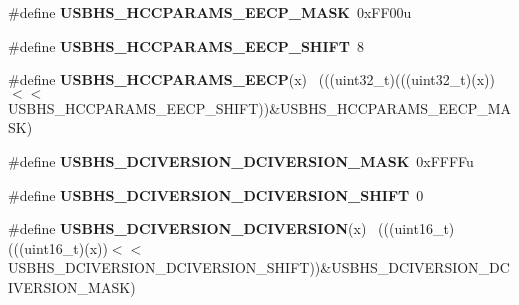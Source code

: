 \begin{DoxyCompactItemize}
\item 
\hypertarget{group___u_s_b_h_s___register___masks_ga00a806b7c08961160c2d8b6ffb14e380}{}\#define {\bfseries U\+S\+B\+H\+S\+\_\+\+H\+C\+C\+P\+A\+R\+A\+M\+S\+\_\+\+E\+E\+C\+P\+\_\+\+M\+A\+S\+K}~0x\+F\+F00u\label{group___u_s_b_h_s___register___masks_ga00a806b7c08961160c2d8b6ffb14e380}

\item 
\hypertarget{group___u_s_b_h_s___register___masks_ga697092761add4b7509d77b602f200ba1}{}\#define {\bfseries U\+S\+B\+H\+S\+\_\+\+H\+C\+C\+P\+A\+R\+A\+M\+S\+\_\+\+E\+E\+C\+P\+\_\+\+S\+H\+I\+F\+T}~8\label{group___u_s_b_h_s___register___masks_ga697092761add4b7509d77b602f200ba1}

\item 
\hypertarget{group___u_s_b_h_s___register___masks_gaf2eae809b350ccb9d8b061f40caa9e9f}{}\#define {\bfseries U\+S\+B\+H\+S\+\_\+\+H\+C\+C\+P\+A\+R\+A\+M\+S\+\_\+\+E\+E\+C\+P}(x)                                ~(((uint32\+\_\+t)(((uint32\+\_\+t)(x))$<$$<$U\+S\+B\+H\+S\+\_\+\+H\+C\+C\+P\+A\+R\+A\+M\+S\+\_\+\+E\+E\+C\+P\+\_\+\+S\+H\+I\+F\+T))\&U\+S\+B\+H\+S\+\_\+\+H\+C\+C\+P\+A\+R\+A\+M\+S\+\_\+\+E\+E\+C\+P\+\_\+\+M\+A\+S\+K)\label{group___u_s_b_h_s___register___masks_gaf2eae809b350ccb9d8b061f40caa9e9f}

\item 
\hypertarget{group___u_s_b_h_s___register___masks_ga7ada79f215237f768f3098114bf1b569}{}\#define {\bfseries U\+S\+B\+H\+S\+\_\+\+D\+C\+I\+V\+E\+R\+S\+I\+O\+N\+\_\+\+D\+C\+I\+V\+E\+R\+S\+I\+O\+N\+\_\+\+M\+A\+S\+K}~0x\+F\+F\+F\+Fu\label{group___u_s_b_h_s___register___masks_ga7ada79f215237f768f3098114bf1b569}

\item 
\hypertarget{group___u_s_b_h_s___register___masks_ga24d240fb588346ff3092aa123808424b}{}\#define {\bfseries U\+S\+B\+H\+S\+\_\+\+D\+C\+I\+V\+E\+R\+S\+I\+O\+N\+\_\+\+D\+C\+I\+V\+E\+R\+S\+I\+O\+N\+\_\+\+S\+H\+I\+F\+T}~0\label{group___u_s_b_h_s___register___masks_ga24d240fb588346ff3092aa123808424b}

\item 
\hypertarget{group___u_s_b_h_s___register___masks_gae92f6f8197efee16b3f67f4602f3108e}{}\#define {\bfseries U\+S\+B\+H\+S\+\_\+\+D\+C\+I\+V\+E\+R\+S\+I\+O\+N\+\_\+\+D\+C\+I\+V\+E\+R\+S\+I\+O\+N}(x)                  ~(((uint16\+\_\+t)(((uint16\+\_\+t)(x))$<$$<$U\+S\+B\+H\+S\+\_\+\+D\+C\+I\+V\+E\+R\+S\+I\+O\+N\+\_\+\+D\+C\+I\+V\+E\+R\+S\+I\+O\+N\+\_\+\+S\+H\+I\+F\+T))\&U\+S\+B\+H\+S\+\_\+\+D\+C\+I\+V\+E\+R\+S\+I\+O\+N\+\_\+\+D\+C\+I\+V\+E\+R\+S\+I\+O\+N\+\_\+\+M\+A\+S\+K)\label{group___u_s_b_h_s___register___masks_gae92f6f8197efee16b3f67f4602f3108e}


\end{DoxyCompactItemize}
